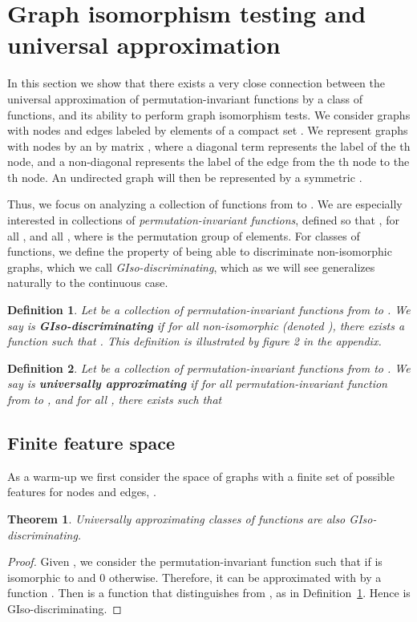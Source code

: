 \documentclass{article}
\newtheorem{theorem}{Theorem}
\newtheorem{definition}{Definition}
\begin{document}
\section{Graph isomorphism testing and universal approximation}
In this section we show that there exists a very close connection between the universal approximation of permutation-invariant functions by a class of functions, and its ability to perform graph isomorphism tests. We consider graphs with nodes and edges labeled by elements of a compact set . We represent graphs with  nodes by an  by  matrix , where a diagonal term  represents the label of the th node, and a non-diagonal  represents the label of the edge from the th node to the th node. An undirected graph will then be represented by a symmetric .  

Thus, we focus on analyzing a collection  of functions from  to . We are especially interested in collections of \textit{permutation-invariant functions}, defined so that , for all , and all , where  is the permutation group of  elements. For classes of functions, we define the property of being able to discriminate non-isomorphic graphs, which we call \textit{GIso-discriminating}, which as we will see generalizes naturally to the continuous case.

\begin{definition}
\label{pd}
Let  be a collection of permutation-invariant functions from  to . We say  is \textbf{GIso-discriminating} if for all non-isomorphic  (denoted ),  there exists a function  such that . This definition is illustrated by figure 2 in the appendix. 
\end{definition}

\begin{definition}
Let  be a collection of permutation-invariant functions from  to . We say  is \textbf{universally approximating} if for all permutation-invariant function  from  to , and for all , there exists  such that 
\end{definition}



\subsection{Finite feature space}
As a warm-up we first consider the space of graphs with a finite set of possible features for nodes and edges, .  

\begin{theorem}
\label{UA2PD}
Universally approximating classes of functions are also GIso-discriminating.
\end{theorem}
\vspace{-1.0em}
\begin{proof}
Given , we consider the permutation-invariant function  such that  if   is isomorphic to  and 0 otherwise. Therefore, it can be approximated with  by a function . Then  is a function that distinguishes  from , as in Definition~\ref{pd}. Hence  is GIso-discriminating.
\end{proof}
\end{document}
